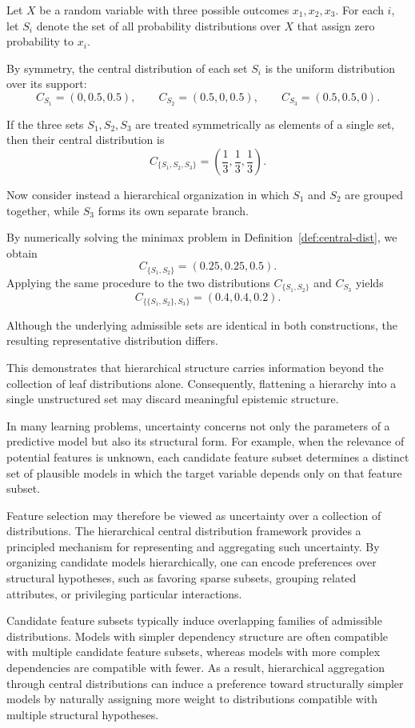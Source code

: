\begin{example}
    Let \(X\) be a random variable with three possible outcomes \(x_1,x_2,x_3\).
    For each \(i\), let \(S_i\) denote the set of all probability distributions over \(X\) that assign zero probability to \(x_i\).

    By symmetry, the central distribution of each set \(S_i\) is the uniform distribution over its support:
    \[
        C_{S_1}=\left(0,0.5,0.5\right),\qquad
        C_{S_2}=\left(0.5,0,0.5\right),\qquad
        C_{S_3}=\left(0.5,0.5,0\right).
    \]

    If the three sets \(S_1,S_2,S_3\) are treated symmetrically as elements of a single set, then their central
    distribution is
    \[
        C_{\{S_1,S_2,S_3\}}=
        \left(\frac13,\frac13,\frac13\right).
    \]

    Now consider instead a hierarchical organization in which \(S_1\) and \(S_2\) are grouped together, while \(S_3\)
    forms its own separate branch.

    By numerically solving the minimax problem in
    Definition~\ref{def:central-dist}, we obtain
    \[
        C_{\{S_1,S_2\}} = \left(0.25, 0.25, 0.5\right).
    \]
    Applying the same procedure to the two distributions
    $C_{\{S_1,S_2\}}$ and $C_{S_3}$ yields
    \[
        C_{\{\{S_1,S_2\}, S_3\}} = \left(0.4, 0.4, 0.2\right).
    \]

    Although the underlying admissible sets are identical in both constructions, the resulting representative
    distribution differs.
\end{example}

This demonstrates that hierarchical structure carries information beyond the collection of leaf distributions
alone.
Consequently, flattening a hierarchy into a single unstructured set may discard meaningful epistemic structure.

In many learning problems, uncertainty concerns not only the parameters of a predictive model but also its
structural form.
For example, when the relevance of potential features is unknown, each candidate feature subset determines a
distinct set of plausible models in which the target variable depends only on that feature subset.

Feature selection may therefore be viewed as uncertainty over a collection of distributions.
The hierarchical central distribution framework provides a principled mechanism for representing and aggregating such
uncertainty.
By organizing candidate models hierarchically, one can encode preferences over structural hypotheses, such as
favoring sparse subsets, grouping related attributes, or privileging particular interactions.

Candidate feature subsets typically induce overlapping families of admissible distributions.
Models with simpler dependency structure are often compatible with multiple candidate feature subsets, whereas
models with more complex dependencies are compatible with fewer.
As a result, hierarchical aggregation through central distributions can induce a preference toward structurally
simpler models by naturally assigning more weight to distributions compatible with multiple structural hypotheses.

